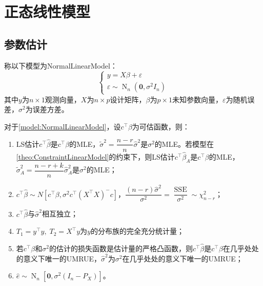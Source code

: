 \section{正态线性模型}
\subsection{参数估计}
\begin{definition}\label{model:NormalLinearModel}
	称以下模型为\gls{NormalLinearModel}：
	\begin{equation*}
		\begin{cases}
			y=X\beta+\varepsilon \\
			\varepsilon\sim\operatorname{N}_n(\mathbf{0},\sigma^2I_n)
		\end{cases}
	\end{equation*}
	其中$y$为$n\times 1$观测向量，$X$为$n\times p$设计矩阵，$\beta$为$p\times 1$未知参数向量，$\varepsilon$为随机误差，$\sigma^2$为误差方差。
\end{definition}
\begin{property}\label{prop:NormalLinearModel}
	对于\cref{model:NormalLinearModel}，设$c^{\top}\beta$为可估函数，则：
	\begin{enumerate}
		\item LS估计$c^{\top}\hat{\beta}$是$c^{\top}\beta$的MLE，$\tilde{\sigma}^2=\dfrac{n-r}{n}\hat{\sigma}^2$是$\sigma^2$的MLE。若模型在\cref{theo:ConstraintLinearModel}的约束下，则LS估计$c^{\top}\hat{\beta}_A$是$c^{\top}\beta$的MLE，$\tilde{\sigma}_A^2=\dfrac{n-r+k}{n}\hat{\sigma}_A^2$是$\sigma^2$的MLE；
		\item $c^{\top}\hat{\beta}\sim N[c^{\top}\beta,\sigma^2c^{\top}(X^{\top}X)^-c]$，$\dfrac{(n-r)\hat{\sigma}^2}{\sigma^2}=\dfrac{\operatorname{SSE}}{\sigma^2}\sim\chi_{n-r}^2$；
		\item $c^{\top}\hat{\beta}$与$\hat{\sigma}^2$相互独立；
		\item $T_1=y^{\top}y,\;T_2=X^{\top}y$为$y$的分布族的完全充分统计量；
		\item 若$c^{\top}\beta$和$\sigma^2$的估计的损失函数是估计量的严格凸函数，则$c^{\top}\hat{\beta}$是$c^{\top}\beta$在几乎处处的意义下唯一的UMRUE，$\hat{\sigma}^2$为$\sigma^2$在几乎处处的意义下唯一的UMRUE；
		\item $\hat{e}\sim\operatorname{N}_n[\mathbf{0},\sigma^2(I_n-P_X)]$。
	\end{enumerate}
\end{property}
